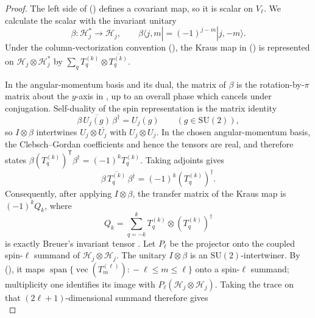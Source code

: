 \documentclass[twoside,10pt]{article}
\numberwithin{equation}{section}
\theoremstyle{slbody}
\theoremstyle{definition}
\theoremstyle{remark}
\newcommand{\SU}{\mathrm{SU}(2)}
\renewcommand{\eqref}[1]{%
  \textup{{\normalfont(\oldstylenums{\ref{#1}}}\normalfont)}}
\begin{document}
\begin{proof}
The left side of \eqref{eq:kraus-recoupling} defines a covariant map,
so it is scalar on \(V_\ell\).  We calculate the scalar with the
invariant unitary
\begin{equation}\label{eq:dual-intertwiner}
 \beta:\mathcal H_j^*\longrightarrow\mathcal H_j,\qquad
 \beta\langle j,m|=(-1)^{j-m}|j,-m\rangle .
\end{equation}
Under the column-vectorization convention
\eqref{eq:column-vectorization}, the Kraus map in
\eqref{eq:kraus-recoupling} is represented on
\(\mathcal H_j\otimes\mathcal H_j^*\) by
\(\sum_qT_q^{(k)}\otimes\overline{T_q^{(k)}}\).

In the angular-momentum basis and its dual, the matrix of \(\beta\) is
the rotation-by-\(\pi\) matrix about the \(y\)-axis in
\cite[Eq.~(3.10)]{Breuer2005}, up to an overall phase which cancels
under conjugation.  Self-duality of the spin representation is the
matrix identity
\begin{equation}\label{eq:beta-intertwiner}
 \beta\,\overline{U_j(g)}\,\beta^\dagger=U_j(g)
 \qquad(g\in\SU),
\end{equation}
so \(I\otimes\beta\) intertwines
\(U_j\otimes\overline{U_j}\) with \(U_j\otimes U_j\).
In the chosen angular-momentum basis, the Clebsch--Gordan coefficients
and hence the tensors are real, and
\cite[Eq.~(A6)]{Breuer2005} therefore states
\(\beta(T_q^{(k)})^{\mathsf T}\beta^\dagger=(-1)^kT_q^{(k)}\).
Taking adjoints gives
\begin{equation}\label{eq:dual-tensor-phase}
 \beta\,\overline{T_q^{(k)}}\,\beta^\dagger
 =(-1)^k(T_q^{(k)})^\dagger .
\end{equation}
Consequently, after applying \(I\otimes\beta\), the transfer matrix of
the Kraus map is \((-1)^kQ_k\), where
\begin{equation*}
 Q_k=\sum_{q=-k}^kT_q^{(k)}\otimes(T_q^{(k)})^\dagger
\end{equation*}
is exactly Breuer's invariant tensor
\cite[Eq.~(2.7)]{Breuer2005}.  Let \(P_\ell\) be the projector onto
the coupled spin-\(\ell\) summand of
\(\mathcal H_j\otimes\mathcal H_j\).  The unitary
\(I\otimes\beta\) is an \(\SU\)-intertwiner.  By
\eqref{eq:tensor-transform}, it maps
\(\operatorname{span}\{\operatorname{vec}(T_m^{(\ell)}):
{}-\ell\leq m\leq\ell\}\)
onto a spin-\(\ell\) summand; multiplicity one identifies its image
with \(P_\ell\mathopen{}(\mathcal H_j\otimes\mathcal H_j)\).  Taking
the trace on that \((2\ell+1)\)-dimensional summand therefore gives
\begin{equation}\label{eq:a-from-QP}

\end{equation}
\end{proof}
\end{document}

